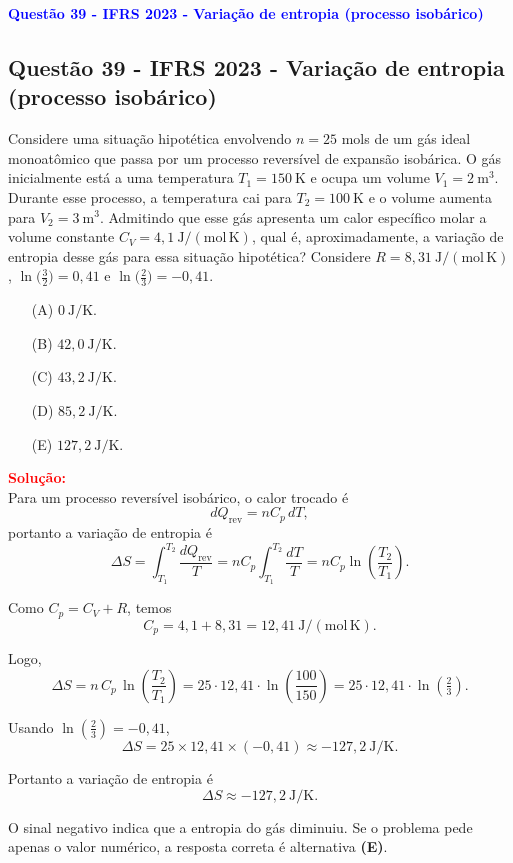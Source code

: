 \begin{flushleft}
\textbf{\textcolor{blue}{\Large Quest\~ao 39 - IFRS 2023 - Varia\c{c}\~ao de entropia (processo isobárico)}}\\
\noindent

\subsection{Quest\~ao 39 - IFRS 2023 - Varia\c{c}\~ao de entropia (processo isobárico)}

Considere uma situação hipotética envolvendo $n=25$ mols de um gás ideal monoatômico que passa por um processo reversível 
de expansão isobárica. O gás inicialmente está a uma temperatura $T_1=150\ \mathrm{K}$ e ocupa um volume $V_1=2\ \mathrm{m^3}$. 
Durante esse processo, a temperatura cai para $T_2=100\ \mathrm{K}$ e o volume aumenta para $V_2=3\ \mathrm{m^3}$. Admitindo que 
esse gás apresenta um calor específico molar a volume constante $C_V=4{,}1\ \mathrm{J/(mol\,K)}$, qual é, aproximadamente, a 
variação de entropia desse gás para essa situação hipotética? Considere $R=8{,}31\ \mathrm{J/(mol\,K)}$, 
$\ln\!\bigl(\tfrac{3}{2}\bigr)=0{,}41$ e $\ln\!\bigl(\tfrac{2}{3}\bigr)=-0{,}41$.

\begin{itemize}
\item[(A)] $0\ \mathrm{J/K}.$
\item[(B)] $42{,}0\ \mathrm{J/K}.$
\item[(C)] $43{,}2\ \mathrm{J/K}.$
\item[(D)] $85{,}2\ \mathrm{J/K}.$
\item[(E)] $127{,}2\ \mathrm{J/K}.$
\end{itemize}

\vspace{0.5cm}

\textcolor{red}{\textbf{Solu\c{c}\~ao:}}\\

Para um processo reversível isobárico, o calor trocado é 
\[
\boxed{
dQ_{\text{rev}}=nC_{p}\,dT,
}
\] 
portanto a variação de entropia é
\[
\Delta S=\int_{T_1}^{T_2}\frac{dQ_{\text{rev}}}{T}
= nC_{p}\int_{T_1}^{T_2}\frac{dT}{T}
= nC_{p}\ln\!\left(\frac{T_2}{T_1}\right).
\]

Como $C_p=C_V+R$, temos
\[
C_p=4{,}1+8{,}31=12{,}41\ \mathrm{J/(mol\,K)}.
\]

Logo,
\[
\Delta S = n\,C_p\,\ln\!\left(\frac{T_2}{T_1}\right)
=25\cdot 12{,}41\cdot \ln\!\left(\frac{100}{150}\right)
=25\cdot 12{,}41\cdot \ln\!\left(\tfrac{2}{3}\right).
\]

Usando $\ln\!\left(\tfrac{2}{3}\right)=-0{,}41$,
\[
\Delta S =25\times 12{,}41\times(-0{,}41)\approx -127{,}2\ \mathrm{J/K}.
\]

Portanto a variação de entropia é
\[
\boxed{\Delta S \approx -127{,}2\ \mathrm{J/K}.}
\]

O \colorbox{yellow!50}{sinal negativo indica que a entropia do gás diminuiu.} Se o problema pede apenas o valor numérico, a resposta correta é alternativa \colorbox{green!50}{\textbf{(E)}}.
\end{flushleft}


